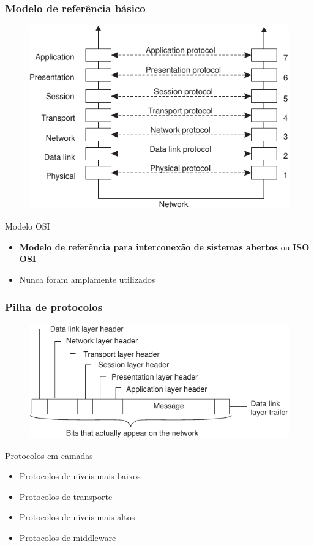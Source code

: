 \documentclass[xcolor=dvipsnames,10pt,compress,aspectratio=169]{beamer}
\begin{document}
\begin{frame}
  \frametitle{Modelo de referência básico}
{
  \vspace{-2mm}
}
  \begin{figure}[ht]
  \centering
  \includegraphics[scale=0.8]{04-01}
  \end{figure}
{
  \vspace{-2mm}
}
  \pause
  \begin{block}{Modelo OSI}
    \begin{itemize}
    \item {\bf Modelo de referência para interconexão de sistemas abertos} ou \textbf{ISO OSI}
    \item Nunca foram amplamente utilizados
    \end{itemize}
  \end{block}
\end{frame}

\begin{frame}
  \frametitle{Pilha de protocolos}
  \begin{figure}[ht]
  \centering
  \includegraphics[scale=0.9]{04-02}
  \end{figure}
  \pause
  \begin{block}{Protocolos em camadas}
    \begin{itemize}
    \item Protocolos de níveis mais baixos
    \item Protocolos de transporte
    \item Protocolos de níveis mais altos
    \item Protocolos de middleware
    \end{itemize}
  \end{block}
\end{frame}
\end{document}
